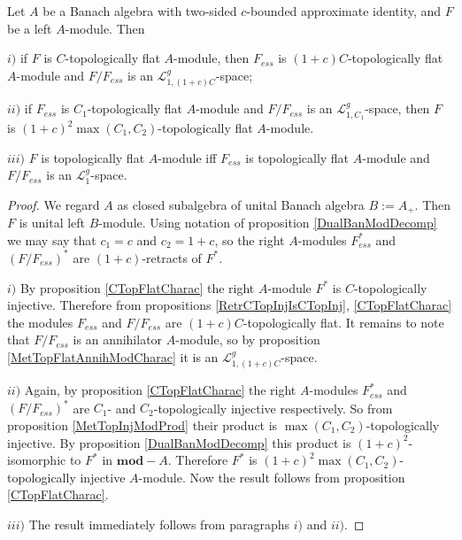 \begin{proposition}\label{TopFlatModCharac} Let $A$ be a Banach algebra with two-sided $c$-bounded approximate identity, and $F$ be a left $A$-module. Then

$i)$ if $F$ is $C$-topologically flat $A$-module, then $F_{ess}$ is $(1+c)C$-topologically flat $A$-module and $F/F_{ess}$ is an $\mathscr{L}_{1,(1+c)C}^g$-space;

$ii)$ if $F_{ess}$ is $C_1$-topologically flat $A$-module and $F/F_{ess}$ is an $\mathscr{L}_{1,C_1}^g$-space, then $F$ is $(1+c)^2\max(C_1, C_2)$-topologically flat $A$-module.

$iii)$ $F$ is topologically flat $A$-module iff $F_{ess}$  is topologically flat $A$-module and $F/F_{ess}$ is an $\mathscr{L}_1^g$-space.
\end{proposition}
\begin{proof} We regard $A$ as closed subalgebra of unital Banach algebra $B:=A_+$. Then $F$ is unital left $B$-module. Using notation of proposition \ref{DualBanModDecomp} we may say that $c_1=c$ and $c_2=1+c$, so the right $A$-modules $F_{ess}^*$ and $(F/F_{ess})^*$ are $(1+c)$-retracts of $F^*$.

$i)$ By proposition \ref{CTopFlatCharac} the right $A$-module $F^*$ is $C$-topologically injective. Therefore from propositions \ref{RetrCTopInjIsCTopInj}, \ref{CTopFlatCharac} the modules $F_{ess}$ and $F/F_{ess}$ are $(1+c)C$-topologically flat. It remains to note that $F/F_{ess}$ is an annihilator $A$-module, so by proposition \ref{MetTopFlatAnnihModCharac} it is an $\mathscr{L}_{1,(1+c)C}^g$-space.

$ii)$ Again, by proposition \ref{CTopFlatCharac} the right $A$-modules $F_{ess}^*$ and $(F/F_{ess})^*$ are $C_1$- and $C_2$-topologically injective respectively. So from proposition \ref{MetTopInjModProd} their product is $\max(C_1,C_2)$-topologically injective. By proposition \ref{DualBanModDecomp} this product is $(1+c)^2$-isomorphic to $F^*$ in $\mathbf{mod}-A$. Therefore $F^*$ is $(1+c)^2\max(C_1, C_2)$-topologically injective $A$-module. Now the result follows from proposition \ref{CTopFlatCharac}.

$iii)$ The result immediately follows from paragraphs $i)$ and $ii)$.
\end{proof}

